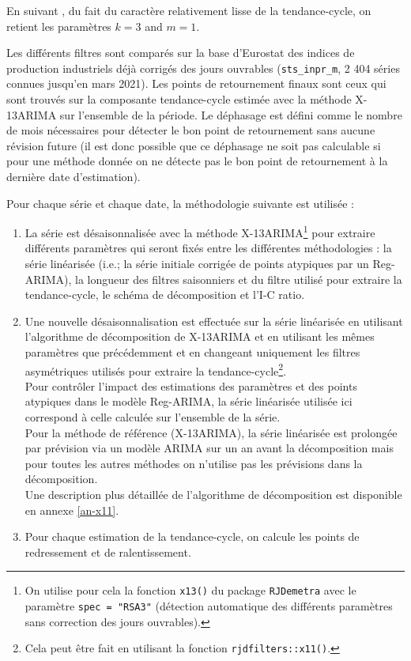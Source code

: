 \documentclass[
  11pt,
  french,
  a4paper]{article}
\newcommand\1{\mathds{1}}
\begin{document}
En suivant \textcite{Zellner1991}, du fait du caractère relativement lisse de la tendance-cycle, on retient les paramètres \(k=3\) and \(m=1\).

Les différents filtres sont comparés sur la base d'Eurostat des indices de production industriels déjà corrigés des jours ouvrables (\texttt{sts\_inpr\_m}, 2 404 séries connues jusqu'en mars 2021).
Les points de retournement finaux sont ceux qui sont trouvés sur la composante tendance-cycle estimée avec la méthode X-13ARIMA sur l'ensemble de la période.
Le déphasage est défini comme le nombre de mois nécessaires pour détecter le bon point de retournement sans aucune révision future (il est donc possible que ce déphasage ne soit pas calculable si pour une méthode donnée on ne détecte pas le bon point de retournement à la dernière date d'estimation).

Pour chaque série et chaque date, la méthodologie suivante est utilisée :

\begin{enumerate}
\def\labelenumi{\arabic{enumi}.}
\item
  La série est désaisonnalisée avec la méthode X-13ARIMA\footnote{
    On utilise pour cela la fonction \texttt{x13()} du package \texttt{RJDemetra} avec le paramètre \texttt{spec\ =\ "RSA3"} (détection automatique des différents paramètres sans correction des jours ouvrables).} pour extraire différents paramètres qui seront fixés entre les différentes méthodologies : la série linéarisée (i.e.; la série initiale corrigée de points atypiques par un Reg-ARIMA), la longueur des filtres saisonniers et du filtre utilisé pour extraire la tendance-cycle, le schéma de décomposition et l'I-C ratio.
\item
  Une nouvelle désaisonnalisation est effectuée sur la série linéarisée en utilisant l'algorithme de décomposition de X-13ARIMA et en utilisant les mêmes paramètres que précédemment et en changeant uniquement les filtres asymétriques utilisés pour extraire la tendance-cycle\footnote{
    Cela peut être fait en utilisant la fonction \texttt{rjdfilters::x11()}.}.\\
  Pour contrôler l'impact des estimations des paramètres et des points atypiques dans le modèle Reg-ARIMA, la série linéarisée utilisée ici correspond à celle calculée sur l'ensemble de la série.\\
  Pour la méthode de référence (X-13ARIMA), la série linéarisée est prolongée par prévision via un modèle ARIMA sur un an avant la décomposition mais pour toutes les autres méthodes on n'utilise pas les prévisions dans la décomposition.\\
  Une description plus détaillée de l'algorithme de décomposition est disponible en annexe \ref{an-x11}.
\item
  Pour chaque estimation de la tendance-cycle, on calcule les points de redressement et de ralentissement.
\end{enumerate}
\end{document}
